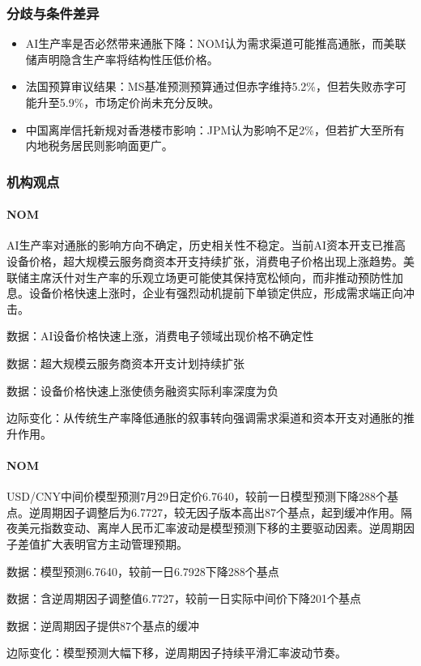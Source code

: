 \documentclass[11pt]{ctexart}
\begin{document}
\subsubsection*{分歧与条件差异}
\begin{itemize}
  \item AI生产率是否必然带来通胀下降：NOM认为需求渠道可能推高通胀，而美联储声明隐含生产率将结构性压低价格。
  \item 法国预算审议结果：MS基准预测预算通过但赤字维持5.2\%，但若失败赤字可能升至5.9\%，市场定价尚未充分反映。
  \item 中国离岸信托新规对香港楼市影响：JPM认为影响不足2\%，但若扩大至所有内地税务居民则影响面更广。
\end{itemize}
\subsubsection*{机构观点}
\paragraph{NOM} AI生产率对通胀的影响方向不确定，历史相关性不稳定。当前AI资本开支已推高设备价格，超大规模云服务商资本开支持续扩张，消费电子价格出现上涨趋势。美联储主席沃什对生产率的乐观立场更可能使其保持宽松倾向，而非推动预防性加息。设备价格快速上涨时，企业有强烈动机提前下单锁定供应，形成需求端正向冲击。
{\small\color{refgray}数据：AI设备价格快速上涨，消费电子领域出现价格不确定性\par}
{\small\color{refgray}数据：超大规模云服务商资本开支计划持续扩张\par}
{\small\color{refgray}数据：设备价格快速上涨使债务融资实际利率深度为负\par}
{\small\color{refgray}边际变化：从传统生产率降低通胀的叙事转向强调需求渠道和资本开支对通胀的推升作用。\par}
\paragraph{NOM} USD/CNY中间价模型预测7月29日定价6.7640，较前一日模型预测下降288个基点。逆周期因子调整后为6.7727，较无因子版本高出87个基点，起到缓冲作用。隔夜美元指数变动、离岸人民币汇率波动是模型预测下移的主要驱动因素。逆周期因子差值扩大表明官方主动管理预期。
{\small\color{refgray}数据：模型预测6.7640，较前一日6.7928下降288个基点\par}
{\small\color{refgray}数据：含逆周期因子调整值6.7727，较前一日实际中间价下降201个基点\par}
{\small\color{refgray}数据：逆周期因子提供87个基点的缓冲\par}
{\small\color{refgray}边际变化：模型预测大幅下移，逆周期因子持续平滑汇率波动节奏。\par}
\end{document}
